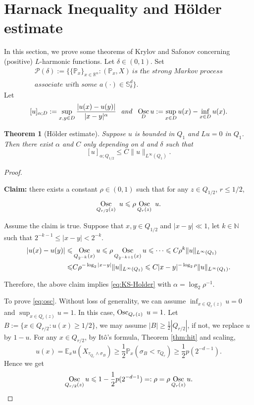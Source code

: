 \documentclass[twoside, 12pt]{book}
\numberwithin{equation}{chapter}
\newtheorem{theorem}{Theorem}[section]
\def\mE{{\mathbb E}}
\def\mN{{\mathbb N}}
\def\mP{{\mathbb P}}
\def\mR{{\mathbb R}}
\def\mS{{\mathbb S}}
\def\sP{{\mathscr P}}
\def\geq{\geqslant}
\def\leq{\leqslant}
\def\osc{\mathop{{\rm Osc}}}
\begin{document}
	\section{Harnack Inequality and H\"older estimate}
	In this section, we prove some theorems of Krylov and Safonov \cite{krylov1981certain} concerning (positive) $L$-harmonic functions. Let $\delta\in(0,1)$. Set 
	\begin{align*}
	    \sP(\delta):=\Big\{\{\mP_x\}_{x\in \mR^n}: (\mP_x, X)  \ \textit{is the strong Markov process} \\
        \textit{associate with some } a(\cdot) \in \mS^d_\delta \Big\}.
	\end{align*}
    Let 
    \[
        [u]_{\alpha; D}:=\sup_{x,y\in D} \frac{|u(x)-u(y)|}{|x-y|^\alpha} ~\textit{ and }~ \osc_D u:= \sup_{x\in D} u(x)-\inf_{x\in D} u(x). 
    \]
	
	\begin{theorem}[H\"older estimate]\label{thm:holder}
	  Suppose $u$ is bounded in $Q_1$ and $
	  Lu =0$ in $Q_1$. Then there exist $\alpha$ and $C$ only depending on $d$ and $\delta$ such that
	  \begin{equation}\label{eq:KS-Holder}
	      [u]_{\alpha; Q_{1/2}}\leq C\|u\|_{L^\infty(Q_1)}.
	  \end{equation} \end{theorem}
	\begin{proof}
  \begin{framed}
      {\bf Claim:} there exists a constant $\rho\in (0,1)$ such that  for any $z\in Q_{1/2}$, $r\leq 1/2$, 
		\begin{equation}\label{eq:osc}
		\osc_{Q_{r/2}(z)} \ u\leq \rho \osc_{Q_{r}(z)} \ u. 
		\end{equation}
  \end{framed}
        Assume the claim is true. Suppose that $x,y\in Q_{1/2}$  and $|x-y|\ll1$, let $k\in \mN$ such that $2^{-k-1}\leq |x-y|< 2^{-k}$. 
        \begin{align*}
            |u(x)-u(y)|\leq& \osc_{Q_{2^{-k}}(x)} u \leq \rho \osc_{Q_{2^{-k+1}}(x)} u \leq \cdots \leq C\rho^k\|u\|_{L^\infty(Q_1)}\\
            \leq& C \rho^{-\log_2 |x-y|}\|u\|_{L^\infty(Q_1)}\leq C |x-y|^{-\log_2\rho} \|u\|_{L^\infty(Q_1)}. 
        \end{align*}
        
        Therefore, the above claim implies \eqref{eq:KS-Holder} with $\alpha=\log_2\rho^{-1}$. 
		
  To prove \eqref{eq:osc}. Without loss of generality, we can assume $\inf_{x\in Q_r(z)}u=0$ and $\sup_{x\in Q_r(z)} u=1$. In this case, $\osc_{Q_{r}(z)} \ u=1$. 
		Let $B:=\{x\in Q_{r/2}: u(x)\geq 1/2\}$, we may assume $|B|\geq \frac{1}{2} |Q_{r/2}|$, if not, we replace $u$ by $1-u$. For any $x\in Q_{r/2}$, by  Itô's formula, Theorem \ref{thm:hit} and scaling,  
		\[
            u(x)=\mE_x u(X_{\tau_{Q_r}\wedge \sigma_B})\geq \frac{1}{2}\mP_x (\sigma_B<\tau_{Q_{r}})\geq \frac{1}{2} p(2^{-d-1}). 
        \]
        Hence we get 
		$$
		\osc_{Q_{r/2}(z)} u \leq 1-\frac{1}{2}p(2^{-d-1})=:\rho=\rho \osc_{Q_{r}(z)}u. 
		$$
	\end{proof}
	
\end{document}
